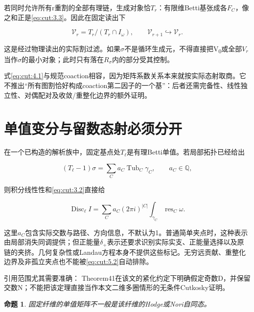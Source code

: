 \documentclass[11pt,a4paper,oneside]{ctexrep}
\theoremstyle{cnplain}
\newtheorem{proposition}[theorem]{命题}
\theoremstyle{definition}
\theoremstyle{remark}
\begin{document}
若同时允许所有r重割的全部有理链，生成对象恰\(T_r\)：有限维Betti基张成各\(F_C\)，像之和正是\eqref{eq:cut:3.3}。因此在固定读出下

\begin{equation}
\mathcal V_r=T_r/(T_r\cap I_\omega),\qquad
 \mathcal V_{r+1}\hookrightarrow\mathcal V_r.          \label{eq:cut:4.3}
\end{equation}

这是经过物理读出的实际割过滤。如果\(\sigma \)不是循环生成元，不得直接把V\textsubscript{0}或全部\(V_r\)当作\(\sigma \)的最小对象；此时只有落在\(R_\sigma \)内的部分受其控制。

式\eqref{eq:cut:4.1}与规范coaction相容，因为矩阵系数关系本来就按实际态射取商。它不推出``所有图割恰好构成coaction第二因子的一个基''：后者还需完备性、线性独立性、对偶配对及收敛/重整化边界的额外证明。

\section{单值变分与留数态射必须分开}\label{sec:cut:5}

在一个已构造的解析族中，固定基点处\(T_\ell \)是有理Betti单值。若局部拓扑已经给出

\begin{equation}
(T_\ell-1)\sigma=\sum_C a_C\operatorname{Tub}_C\gamma_C,
 \qquad a_C\in\mathbb Q,                              \label{eq:cut:5.1}
\end{equation}

则积分线性性和\eqref{eq:cut:3.2}直接给

\begin{equation}
\operatorname{Disc}_\ell I
     =\sum_C a_C(2\pi i)^{|C|}
                      \int_{\gamma_C}\operatorname{res}_C\omega.
                                                               \label{eq:cut:5.2}
\end{equation}

这里\(a_C\)包含实际交数与路径、方向信息，不默认为1。普通简单夹点时，这种表示由局部消失同调提供；但正能量\(\delta _+\)表示还要求识别实际实支、正能量选择以及原链的夹挤。几何复杂性或Landau方程本身不提供这些标记。无穷远贡献、重整化边界及非孤立夹点也不能被\eqref{eq:cut:5.2}自动排除。

引用范围尤其需要准确：\cite{muhlbauer} Theorem41在该文的紧化约定下明确假定奇数D，并保留交数N；不能把该定理直接当作本文二维多圈情形的无条件Cutkosky证明。

\begin{proposition}

\label{thm:cut:5.1} 固定纤维的单值矩阵不一般是该纤维的Hodge或Nori自同态。

\end{proposition}
\end{document}
